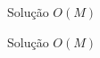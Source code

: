 \begin{frame}[fragile]{Solução $O(M)$}
\end{frame}

\begin{frame}[fragile]{Solução $O(M)$}
\end{frame}
